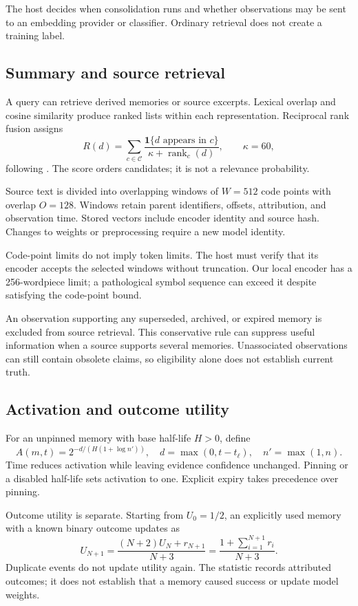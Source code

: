 \documentclass[11pt]{article}
\newcommand{\ind}{\mathbf{1}}
\begin{document}
The host decides when consolidation runs and whether observations may be sent to an embedding provider or classifier. Ordinary retrieval does not create a training label.

\subsection{Summary and source retrieval}
A query can retrieve derived memories or source excerpts. Lexical overlap and cosine similarity produce ranked lists within each representation. Reciprocal rank fusion assigns
\[
 R(d)=\sum_{c\in\mathcal{C}}
 \frac{\ind\{d\text{ appears in }c\}}{\kappa+\operatorname{rank}_c(d)},
 \qquad \kappa=60,
\]
following \citet{rrf}. The score orders candidates; it is not a relevance probability.

Source text is divided into overlapping windows of $W=512$ code points with overlap $O=128$. Windows retain parent identifiers, offsets, attribution, and observation time. Stored vectors include encoder identity and source hash. Changes to weights or preprocessing require a new model identity.

Code-point limits do not imply token limits. The host must verify that its encoder accepts the selected windows without truncation. Our local encoder has a 256-wordpiece limit; a pathological symbol sequence can exceed it despite satisfying the code-point bound.

An observation supporting any superseded, archived, or expired memory is excluded from source retrieval. This conservative rule can suppress useful information when a source supports several memories. Unassociated observations can still contain obsolete claims, so eligibility alone does not establish current truth.

\subsection{Activation and outcome utility}
For an unpinned memory with base half-life $H>0$, define
\[
 A(m,t)=2^{-d/(H(1+\log n'))},\quad
 d=\max(0,t-t_\ell),\quad n'=\max(1,n).
\]
Time reduces activation while leaving evidence confidence unchanged. Pinning or a disabled half-life sets activation to one. Explicit expiry takes precedence over pinning.

Outcome utility is separate. Starting from $U_0=1/2$, an explicitly used memory with a known binary outcome updates as
\[
 U_{N+1}=\frac{(N+2)U_N+r_{N+1}}{N+3}
        =\frac{1+\sum_{i=1}^{N+1}r_i}{N+3}.
\]
Duplicate events do not update utility again. The statistic records attributed outcomes; it does not establish that a memory caused success or update model weights.
\end{document}
